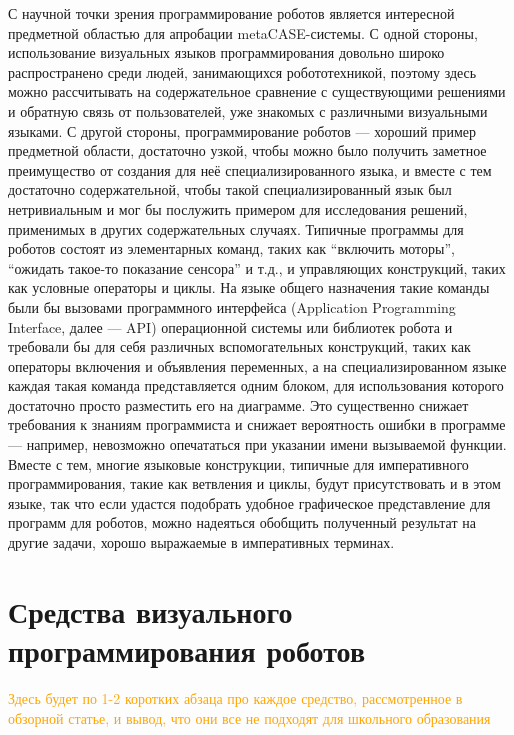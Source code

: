 \documentclass[a4paper]{article}
\begin{document}
С научной точки зрения программирование роботов является интересной предметной областью для апробации metaCASE-системы. С одной стороны, использование визуальных языков программирования довольно широко распространено среди людей, занимающихся робототехникой, поэтому здесь можно рассчитывать на содержательное сравнение с существующими решениями и обратную связь от пользователей, уже знакомых с различными визуальными языками. С другой стороны, программирование роботов --- хороший пример предметной области, достаточно узкой, чтобы можно было получить заметное преимущество от создания для неё специализированного языка, и вместе с тем достаточно содержательной, чтобы такой специализированный язык был нетривиальным и мог бы послужить примером для исследования решений, применимых в других содержательных случаях. Типичные программы для роботов состоят из элементарных команд, таких как ``включить моторы'', ``ожидать такое-то показание сенсора'' и т.д., и управляющих конструкций, таких как условные операторы и циклы. На языке общего назначения такие команды были бы вызовами программного интерфейса (Application Programming Interface, далее --- API) операционной системы или библиотек робота и требовали бы для себя различных вспомогательных конструкций, таких как операторы включения и объявления переменных, а на специализированном языке каждая такая команда представляется одним блоком, для использования которого достаточно просто разместить его на диаграмме. Это существенно снижает требования к знаниям программиста и снижает вероятность ошибки в программе --- например, невозможно опечататься при указании имени вызываемой функции. Вместе с тем, многие языковые конструкции, типичные для императивного программирования, такие как ветвления и циклы, будут присутствовать и в этом языке, так что если удастся подобрать удобное графическое представление для программ для роботов, можно надеяться обобщить полученный результат на другие задачи, хорошо выражаемые в императивных терминах.

\section{Средства визуального программирования роботов}
\textcolor{Orange}{Здесь будет по 1-2 коротких абзаца про каждое средство, рассмотренное в обзорной статье, и вывод, что они все не подходят для школьного образования}
\end{document}

